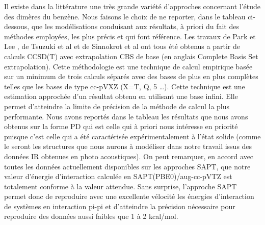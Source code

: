 	
	Il existe dans la littérature une très grande variété d’approches concernant l’étude des dimères du benzène. Nous faisons le choix de ne reporter, dans le tableau ci-dessous, que les modélisations conduisant aux résultats, à priori du fait des méthodes employées, les plus précis et qui font référence. Les travaux de Park et Lee \cite{park2006accurate}, de Tsuzuki et al \cite{tsuzuki2002origin} et de Sinnokrot et al \cite{hobza1996potential} ont tous été obtenus a partir de calculs CCSD(T) avec extrapolation CBS de base (en anglais Complete Basis Set extrapolation). Cette méthodologie est une technique de calcul empirique basée sur un minimum de trois calculs séparés avec des bases de plus en plus complètes telles que les bases de type cc-pVXZ (X=T, Q, 5 …). Cette technique est une estimation approchée d’un résultat obtenu en utilisant une base infini. Elle permet d’atteindre la limite de précision de la méthode de calcul la plus performante. Nous avons reportés dans le tableau les résultats que nous avons obtenus sur la forme PD qui est celle qui à priori nous intéresse en priorité puisque c’est celle qui a été caractérisée expérimentalement à l’état solide (comme le seront les structures que nous aurons à modéliser dans notre travail issus des données IR obtenues en photo acoustiques). On peut remarquer, en accord avec toutes les données actuellement disponibles sur les approches SAPT, que notre valeur d’énergie d’interaction calculée en SAPT(PBE0)/aug-cc-pVTZ est totalement conforme à la valeur attendue. Sans surprise, l’approche SAPT permet donc de reproduire avec une excellente vélocité les énergies d’interaction de systèmes en interaction pi-pi et d’atteindre la précision nécessaire pour reproduire des données aussi faibles que 1 à 2 kcal/mol.
	
